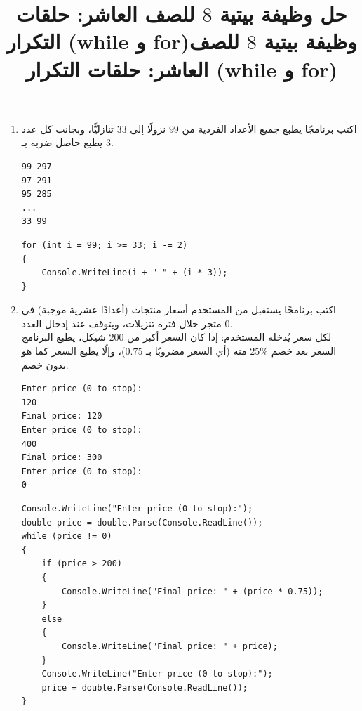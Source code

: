 \documentclass[14pt]{extarticle}
\title{حل وظيفة بيتية $8$ للصف العاشر: حلقات التكرار (\textenglish{while} و \textenglish{for})}
\title{وظيفة بيتية $8$ للصف العاشر: حلقات التكرار (\textenglish{while} و \textenglish{for})}
\begin{document}
\maketitle
\thispagestyle{fancy}

\begin{enumerate}[itemsep=2em]

\item اكتب برنامجًا يطبع جميع الأعداد الفردية من $99$ نزولًا إلى $33$ تنازليًّا، وبجانب كل عدد يطبع حاصل ضربه بـ $3$.
\ifdetailed
\begin{boxExample}
\begin{english}
\begin{verbatim}
99 297
97 291
95 285
...
33 99
\end{verbatim}
\end{english}
\end{boxExample}
\fi
\ifwithsols
\begin{boxSolution}
\begin{english}
\begin{verbatim}
for (int i = 99; i >= 33; i -= 2)
{
    Console.WriteLine(i + " " + (i * 3));
}
\end{verbatim}
\end{english}
\end{boxSolution}
\fi
\filbreak

\item اكتب برنامجًا يستقبل من المستخدم أسعار منتجات (أعدادًا عشرية موجبة) في متجر خلال فترة تنزيلات، ويتوقف عند إدخال العدد $0$. \\
لكل سعر يُدخله المستخدم: إذا كان السعر أكبر من $200$ شيكل، يطبع البرنامج السعر بعد خصم $25\%$ منه (أي السعر مضروبًا بـ $0.75$)، وإلّا يطبع السعر كما هو بدون خصم.
\ifdetailed
\begin{boxExample}
\begin{english}
\begin{verbatim}
Enter price (0 to stop):
120
Final price: 120
Enter price (0 to stop):
400
Final price: 300
Enter price (0 to stop):
0
\end{verbatim}
\end{english}
\end{boxExample}
\fi
\ifwithsols
\begin{boxSolution}
\begin{english}
\begin{verbatim}
Console.WriteLine("Enter price (0 to stop):");
double price = double.Parse(Console.ReadLine());
while (price != 0)
{
    if (price > 200)
    {
        Console.WriteLine("Final price: " + (price * 0.75));
    }
    else
    {
        Console.WriteLine("Final price: " + price);
    }
    Console.WriteLine("Enter price (0 to stop):");
    price = double.Parse(Console.ReadLine());
}
\end{verbatim}
\end{english}
\end{boxSolution}
\fi
\filbreak


\end{enumerate}
\end{document}
